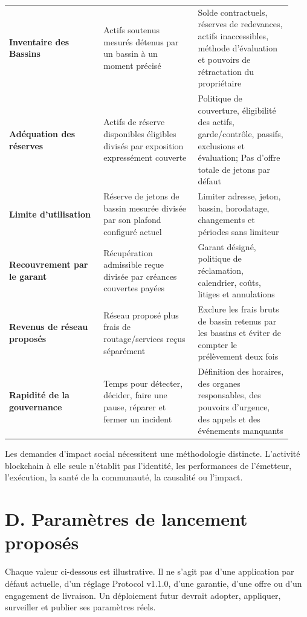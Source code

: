 \documentclass[11pt]{article}
\begin{document}
\begin{longtable}{P{0.31\linewidth} P{0.31\linewidth} P{0.31\linewidth}}
\textbf{Inventaire des Bassins} & Actifs soutenus mesurés détenus par un bassin à un moment précisé & Solde contractuels, réserves de redevances, actifs inaccessibles, méthode d'évaluation et pouvoirs de rétractation du propriétaire \\
\textbf{Adéquation des réserves} & Actifs de réserve disponibles éligibles divisés par exposition expressément couverte & Politique de couverture, éligibilité des actifs, garde/contrôle, passifs, exclusions et évaluation; Pas d'offre totale de jetons par défaut \\
\textbf{Limite d'utilisation} & Réserve de jetons de bassin mesurée divisée par son plafond configuré actuel & Limiter adresse, jeton, bassin, horodatage, changements et périodes sans limiteur \\
\textbf{Recouvrement par le garant} & Récupération admissible reçue divisée par créances couvertes payées & Garant désigné, politique de réclamation, calendrier, coûts, litiges et annulations \\
\textbf{Revenus de réseau proposés} & Réseau proposé plus frais de routage/services reçus séparément & Exclure les frais bruts de bassin retenus par les bassins et éviter de compter le prélèvement deux fois \\
\textbf{Rapidité de la gouvernance} & Temps pour détecter, décider, faire une pause, réparer et fermer un incident & Définition des horaires, des organes responsables, des pouvoirs d'urgence, des appels et des événements manquants \\
\bottomrule
\end{longtable}

Les demandes d'impact social nécessitent une méthodologie distincte. L'activité blockchain à elle seule n'établit pas l'identité, les performances de l'émetteur, l'exécution, la santé de la communauté, la causalité ou l'impact.


\section*{D. Paramètres de lancement proposés}

Chaque valeur ci-dessous est illustrative. Il ne s'agit pas d'une application par défaut actuelle, d'un réglage Protocol v1.1.0, d'une garantie, d'une offre ou d'un engagement de livraison. Un déploiement futur devrait adopter, appliquer, surveiller et publier ses paramètres réels.
\end{document}
